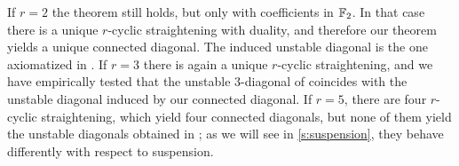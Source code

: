 If $r=2$ the theorem still holds, but only with coefficients in $\mathbb{F}_2$.
In that case there is a unique $r$-cyclic straightening with duality, and therefore our theorem yields a unique connected diagonal.
The induced unstable diagonal is the one axiomatized in \cite{medina2022axiomatic}.
If $r = 3$ there is again a unique $r$-cyclic straightening, and we have empirically tested that the unstable $3$-diagonal of \cite{medina2021may_st} coincides with the unstable diagonal induced by our connected diagonal.
If $r = 5$, there are four $r$-cyclic straightening, which yield four connected diagonals, but none of them yield the unstable diagonals obtained in \cite{medina2021may_st}; as we will see in \cref{s:suspension}, they behave differently with respect to suspension.

